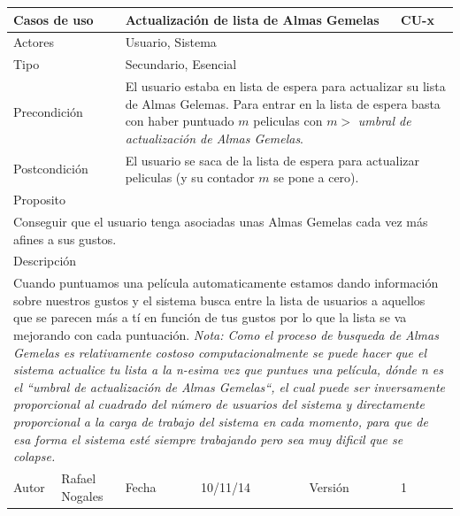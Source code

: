 \documentclass{article}
\begin{document}
\begin{table}[h]
\begin{tabular}{|l|l|l|l|l|l|}
\hline
\multicolumn{2}{|p{2cm}|}{Casos de uso}  & \multicolumn{3}{p{7cm}|}{\textbf{Actualización de lista de Almas Gemelas}} & CU-x \\
\hline
\multicolumn{2}{|p{2cm}|}{Actores}       & \multicolumn{4}{p{8cm}|}{Usuario, Sistema}        \\
\hline
\multicolumn{2}{|p{2cm}|}{Tipo}          & \multicolumn{4}{p{8cm}|}{Secundario, Esencial}        \\
\hline
\multicolumn{2}{|p{2cm}|}{Precondición}  & \multicolumn{4}{p{8cm}|}{El usuario estaba en lista de espera para actualizar su lista de Almas Gelemas.
Para entrar en la lista de espera basta con haber puntuado $m$ peliculas con $m > $ \textit{umbral de actualización de Almas Gemelas}.}   \\
\hline
\multicolumn{2}{|p{2cm}|}{Postcondición} & \multicolumn{4}{p{8cm}|}{El usuario se saca de la lista de espera para actualizar peliculas (y su contador $m$ se pone a cero).}        \\
\hline
\multicolumn{6}{|p{10cm}|}{Proposito}                                   \\
\hline
\multicolumn{6}{|p{10cm}|}{Conseguir que el usuario tenga asociadas unas Almas Gemelas 
cada vez más afines a sus gustos.}                                            \\
\hline
\multicolumn{6}{|p{10cm}|}{Descripción}                                 \\
\hline
\multicolumn{6}{|p{10cm}|}{Cuando puntuamos una película automaticamente estamos dando información sobre nuestros gustos y el sistema busca entre la lista de usuarios a aquellos que se parecen más a tí en función de tus gustos por lo que la lista se va mejorando con cada puntuación.
\linebreak \linebreak
\textit{Nota: Como el proceso de busqueda de Almas Gemelas es relativamente costoso computacionalmente se puede hacer que el sistema actualice tu lista a la n-esima vez que puntues una película, dónde n es el  ``umbral de actualización de Almas Gemelas``, el cual puede ser inversamente proporcional al cuadrado del número de usuarios del sistema y directamente proporcional a la carga de trabajo del sistema en cada momento, para que de esa forma el sistema esté siempre trabajando pero sea muy dificil que se colapse.}}                                        \\
\hline
Autor              &     Rafael Nogales         & Fecha    &  10/11/14   &   Versión  & 1\\     
\hline
\end{tabular}
\end{table}
\end{document}
